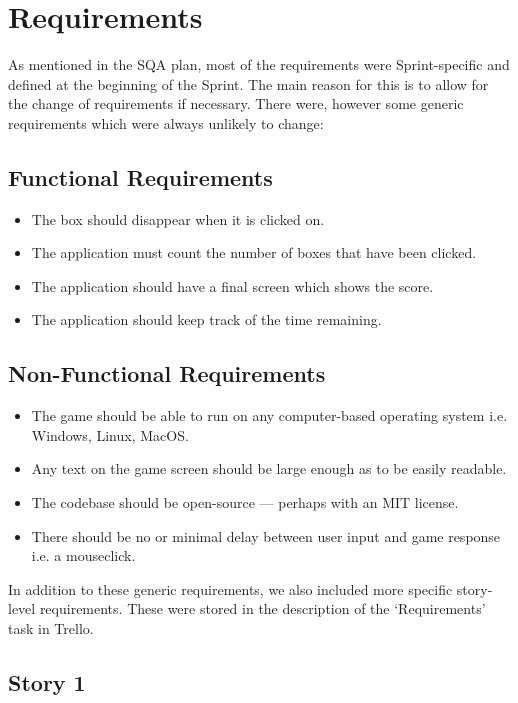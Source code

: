 \documentclass[12pt]{article}
\begin{document}
\section{Requirements}

As mentioned in the SQA plan, most of the requirements were Sprint-specific and defined at the beginning of the Sprint. The main reason for this is to allow for the change of requirements if necessary. There were, however some generic requirements which were always unlikely to change:

\subsection{Functional Requirements}

\begin{itemize}
    \item The box should disappear when it is clicked on.
    \item The application must count the number of boxes that have been clicked.
    \item The application should have a final screen which shows the score.
    \item The application should keep track of the time remaining.
\end{itemize}

\subsection{Non-Functional Requirements}

\begin{itemize}
    \item The game should be able to run on any computer-based operating system i.e. Windows, Linux, MacOS.
    \item Any text on the game screen should be large enough as to be easily readable.
    \item The codebase should be open-source --- perhaps with an MIT license.
    \item There should be no or minimal delay between user input and game response i.e. a mouseclick.
\end{itemize}

In addition to these generic requirements, we also included more specific story-level requirements. These were stored in the description of the `Requirements' task in Trello.

\subsection{Story 1}
\end{document}
